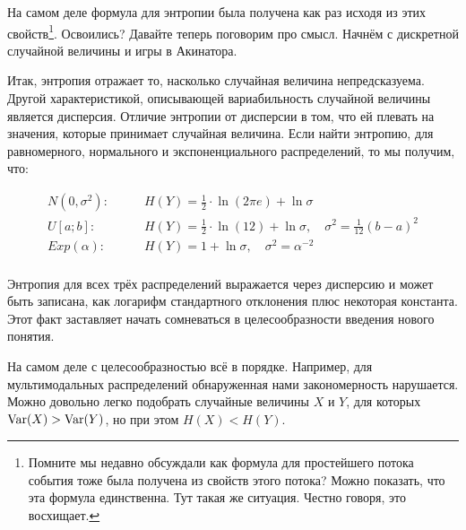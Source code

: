 \documentclass[12pt, a4paper, oneside]{article}
\begin{document}
На самом деле формула для энтропии была получена как раз исходя из этих свойств\footnote{Помните мы недавно обсуждали как формула для простейшего потока события тоже была получена из свойств этого потока? Можно показать, что эта формула единственна. Тут такая же ситуация. Честно говоря, это восхищает.}.  Освоились? Давайте теперь поговорим про смысл. Начнём с дискретной случайной величины и игры в Акинатора. 






Итак, энтропия отражает то, насколько случайная величина непредсказуема. Другой характеристикой, описывающей вариабильность случайной величины является дисперсия. Отличие энтропии от дисперсии в том, что ей плевать на значения, которые принимает случайная величина. Если найти энтропию, для равномерного, нормального и экспоненциального распределений, то мы получим, что:

\begin{equation*}
\begin{aligned}
 N(0,\sigma^2):  \qquad  &H(Y)  = \frac{1}{2} \cdot \ln(2 \pi e) + \ln \sigma \\
 U[a;b]:         \qquad     &H(Y) = \frac{1}{2} \cdot \ln(12) + \ln \sigma,  \quad  \sigma^2 = \frac{1}{12}(b-a)^2 \\ 
 Exp(\alpha):      \qquad &H(Y) = 1 + \ln \sigma, \quad \sigma^2 = \alpha^{-2}\\
\end{aligned}
\end{equation*}

Энтропия для всех трёх распределений выражается через дисперсию и может быть записана, как логарифм стандартного отклонения плюс некоторая константа. Этот факт заставляет начать сомневаться в целесообразности введения нового понятия.

На самом деле с целесообразностью всё в порядке. Например, для мультимодальных распределений обнаруженная нами закономерность нарушается. Можно довольно легко подобрать случайные величины $X$ и $Y$, для которых $\operatorname{Var}(X) > \operatorname{Var}(Y)$, но при этом $H(X) < H(Y)$.
\end{document}
